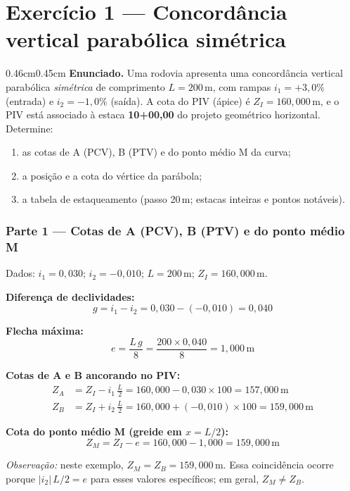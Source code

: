 \documentclass[12pt,letterpaper]{article}
\newenvironment{corpo}{\begin{adjustwidth}{0.46cm}{0.45cm}\justifying}{\end{adjustwidth}}
\begin{document}
\section*{Exercício 1 — Concordância vertical parabólica simétrica}

\begin{corpo}
\textbf{Enunciado.} Uma rodovia apresenta uma concordância vertical parabólica \emph{simétrica} de comprimento $L = 200\,\text{m}$, com rampas $i_1 = {+}3{,}0\%$ (entrada) e $i_2 = {-}1{,}0\%$ (saída). A cota do PIV (ápice) é $Z_I = 160{,}000\,\text{m}$, e o PIV está associado à estaca \textbf{10+00,00} do projeto geométrico horizontal. Determine:
\begin{enumerate}
  \item as cotas de A (PCV), B (PTV) e do ponto médio M da curva;
  \item a posição e a cota do vértice da parábola;
  \item a tabela de estaqueamento (passo 20\,m; estacas inteiras e pontos notáveis).
\end{enumerate}

\subsubsection*{Parte 1 — Cotas de A (PCV), B (PTV) e do ponto médio M}

Dados: $i_1 = 0{,}030$; $i_2 = -0{,}010$; $L = 200\,\text{m}$; $Z_I = 160{,}000\,\text{m}$.

\textbf{Diferença de declividades:}
\[
  g = i_1 - i_2 = 0{,}030 - (-0{,}010) = 0{,}040
\]

\textbf{Flecha máxima:}
\[
  e = \frac{L\,g}{8} = \frac{200 \times 0{,}040}{8} = 1{,}000\,\text{m}
\]

\textbf{Cotas de A e B ancorando no PIV:}
\begin{align*}
  Z_A &= Z_I - i_1\,\frac{L}{2} = 160{,}000 - 0{,}030 \times 100 = 157{,}000\,\text{m}\\[4pt]
  Z_B &= Z_I + i_2\,\frac{L}{2} = 160{,}000 + (-0{,}010) \times 100 = 159{,}000\,\text{m}
\end{align*}

\textbf{Cota do ponto médio M (greide em $x = L/2$):}
\[
  Z_M = Z_I - e = 160{,}000 - 1{,}000 = 159{,}000\,\text{m}
\]

\textit{Observação:} neste exemplo, $Z_M = Z_B = 159{,}000\,\text{m}$. Essa coincidência ocorre porque $|i_2|\,L/2 = e$ para esses valores específicos; em geral, $Z_M \neq Z_B$.


\end{corpo}
\end{document}
